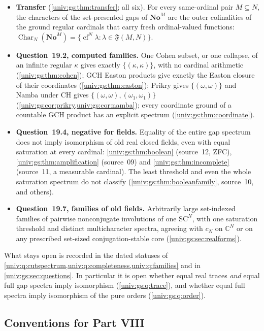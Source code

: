\documentclass[11pt,letterpaper]{article}
\numberwithin{equation}{section}
\theoremstyle{definition}
\theoremstyle{remark}
\newcommand{\No}{\mathbf{No}}
\newcommand{\SC}{\mathrm{SC}}
\newcommand{\NoM}{\No^{M}}
\newcommand{\SCN}{\SC^{N}}
\newcommand{\C}{\mathbb C}
\newcommand{\cf}{\operatorname{cf}}
\newcommand{\Char}{\operatorname{Char}}
\newcommand{\FF}{\mathfrak F}
\begin{document}
\begin{itemize}
\item \textbf{Transfer} (\cref{univ:gs:thm:transfer}; all six). For every
same-ordinal pair $M\subseteq N$, the characters of the set-presented gaps of
$\NoM$ are the outer cofinalities of the ground regular cardinals that carry
fresh ordinal-valued functions:
$\Char_N(\NoM)=\{\cf^N\lambda:\lambda\in\FF(M,N)\}$.
\item \textbf{Question~19.2, computed families.} One Cohen subset, or one
collapse, of an infinite regular $\kappa$ gives exactly $\{(\kappa,\kappa)\}$,
with no cardinal arithmetic (\cref{univ:gs:thm:cohen}); GCH Easton products give
exactly the Easton closure of their coordinates (\cref{univ:gs:thm:easton});
Prikry gives $\{(\omega,\omega)\}$ and Namba under CH gives
$\{(\omega,\omega),(\omega_1,\omega_1)\}$ (\cref{univ:gs:cor:prikry,univ:gs:cor:namba});
every coordinate ground of a countable GCH product has an explicit spectrum
(\cref{univ:gs:thm:coordinate}).
\item \textbf{Question~19.4, negative for fields.} Equality of the entire gap
spectrum does not imply isomorphism of old real closed fields, even with equal
saturation at every cardinal: \cref{univ:gs:thm:boolean} (source~12, ZFC),
\cref{univ:gs:thm:amplification} (source~09) and \cref{univ:gs:thm:incomplete}
(source~11, a measurable cardinal). The least threshold and even the whole
saturation spectrum do not classify (\cref{univ:gs:thm:booleanfamily},
source~10, and others).
\item \textbf{Question~19.7, families of old fields.} Arbitrarily large
set-indexed families of pairwise nonconjugate involutions of one $\SCN$, with
one saturation threshold and distinct multicharacter spectra, agreeing with
$c_N$ on $\C^N$ or on any prescribed set-sized conjugation-stable core
(\cref{univ:gs:sec:realforms}).
\end{itemize}
What stays open is recorded in the dated statuses of
\cref{univ:q:cutspectrum,univ:q:completeness,univ:q:families} and in
\cref{univ:gs:sec:questions}. In particular it is open whether equal real
traces \emph{and} equal full gap spectra imply isomorphism
(\cref{univ:gs:q:trace}), and whether equal full spectra imply isomorphism of
the pure orders (\cref{univ:gs:q:order}).

\subsection{Conventions for Part VIII}\label{univ:gs:sub:notation}
\end{document}
